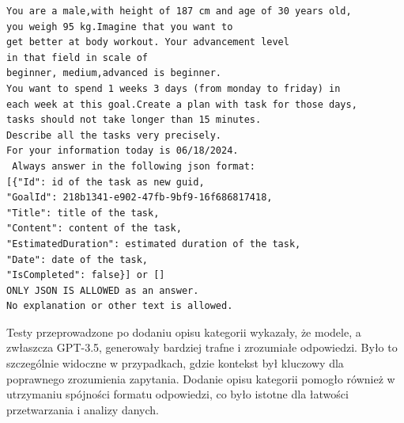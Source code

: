 \begin{lstlisting}[language=html, caption=Finalna wersja promptu dla kategorii sportowej, linewidth=140mm]
You are a male,with height of 187 cm and age of 30 years old, 
you weigh 95 kg.Imagine that you want to
get better at body workout. Your advancement level 
in that field in scale of 
beginner, medium,advanced is beginner. 
You want to spend 1 weeks 3 days (from monday to friday) in 
each week at this goal.Create a plan with task for those days, 
tasks should not take longer than 15 minutes.
Describe all the tasks very precisely. 
For your information today is 06/18/2024.
 Always answer in the following json format:
[{"Id": id of the task as new guid,
"GoalId": 218b1341-e902-47fb-9bf9-16f686817418,
"Title": title of the task,
"Content": content of the task,
"EstimatedDuration": estimated duration of the task,
"Date": date of the task,
"IsCompleted": false}] or []
ONLY JSON IS ALLOWED as an answer. 
No explanation or other text is allowed.
\end{lstlisting}

Testy przeprowadzone po dodaniu opisu kategorii wykazały, że modele, a zwłaszcza GPT-3.5, generowały bardziej trafne i zrozumiałe odpowiedzi. Było to szczególnie widoczne w przypadkach, gdzie kontekst był kluczowy dla poprawnego zrozumienia zapytania. Dodanie opisu kategorii pomogło również w utrzymaniu spójności formatu odpowiedzi, co było istotne dla łatwości przetwarzania i analizy danych.

